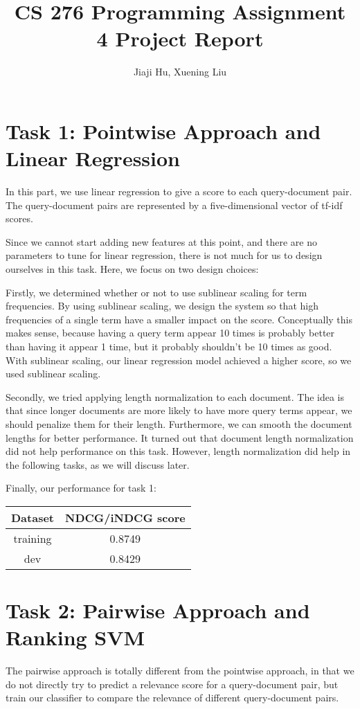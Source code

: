 \documentclass[10pt,twocolumn]{article}
\begin{document}
\title{CS 276 Programming Assignment 4 Project Report}
\author{Jiaji Hu, Xuening Liu}
\date{}
\maketitle

\section*{Task 1: Pointwise Approach and \\Linear Regression}
In this part, we use linear regression to give a score to each query-document pair. The query-document pairs are represented by a five-dimensional vector of tf-idf scores.

Since we cannot start adding new features at this point, and there are no parameters to tune for linear regression, there is not much for us to design ourselves in this task. Here, we focus on two design choices:

Firstly, we determined whether or not to use sublinear scaling for term frequencies. By using sublinear scaling, we design the system so that high frequencies of a single term have a smaller impact on the score. Conceptually this makes sense, because having a query term appear 10 times is probably better than having it appear 1 time, but it probably shouldn't be 10 times as good. With sublinear scaling, our linear regression model achieved a higher score, so we used sublinear scaling.

Secondly, we tried applying length normalization to each document. The idea is that since longer documents are more likely to have more query terms appear, we should penalize them for their length. Furthermore, we can smooth the document lengths for better performance. It turned out that document length normalization did not help performance on this task. However, length normalization did help in the following tasks, as we will discuss later.

Finally, our performance for task 1:
\begin{table}[H]
\centering
\begin{tabular}{|c|c|}
\hline
Dataset & NDCG/iNDCG score \\\hline
training & 0.8749\\\hline
dev & 0.8429\\\hline
\end{tabular}
\end{table}

\section*{Task 2: Pairwise Approach and \\Ranking SVM}
The pairwise approach is totally different from the pointwise approach, in that we do not directly try to predict a relevance score for a query-document pair, but train our classifier to compare the relevance of different query-document pairs.
\end{document}
